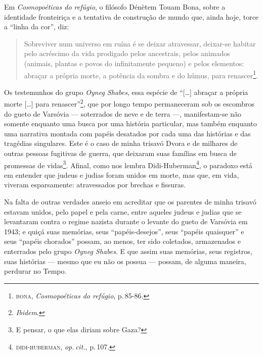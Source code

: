 Em \emph{Cosmopoéticas do refúgio}, o filósofo Dénètem Touam Bona, sobre
a identidade fronteiriça e a tentativa de construção de mundo que, ainda
hoje, torce a ``linha da cor'', diz:

\begin{quote}
Sobreviver num universo em ruína é se deixar atravessar, deixar-se
habitar pelo acréscimo da vida prodigado pelos ancestrais, pelos
animados (animais, plantas e povos do infinitamente pequeno) e pelos
elementos: abraçar a própria morte, a potência da sombra e do húmus,
para renascer\footnote{\textsc{bona}, \emph{Cosmopoéticas do refúgio}, p.\,85-86.}.
\end{quote}

Os testemunhos do grupo \emph{Oyneg Shabes}, essa espécie de
``{[}\ldots{}{]} abraçar a própria morte {[}\ldots{}{]} para
renascer''\footnote{\emph{Ibidem}.}, que por longo tempo permaneceram sob os
escombros do gueto de Varsóvia --- soterrados de neve e de terra ---,
manifestam-se não somente enquanto uma busca por uma história
particular, mas também enquanto uma narrativa montada com papéis
desatados por cada uma das histórias e das tragédias singulares. Este é
o caso de minha trisavó Dvora e de milhares de outras pessoas fugitivas
de guerra, que deixaram suas famílias em busca de promessas de
vidas\footnote{E pensar, o que elas diriam sobre Gaza?}. Afinal, como
nos lembra Didi-Huberman\footnote{\textsc{didi-huberman}, \emph{op.\,cit.}, p.\,107.}, o
paradoxo está em entender que judeus e judias foram unidos em morte, mas
que, em vida, viveram esparsamente: atravessados por brechas e fissuras.

Na falta de outras verdades anseio em acreditar que os parentes de minha
trisavó estavam unidos, pelo papel e pela carne, entre aqueles judeus e
judias que se levantaram contra o regime nazista durante o levante do
gueto de Varsóvia em 1943; e quiçá suas memórias, seus
``papéis-desejos'', seus ``papéis quaisquer'' e seus
``papéis chorados'' possam, ao menos, ter sido coletados,
armazenados e enterrados pelo grupo \emph{Oyneg Shabes}. E que assim
suas memórias, seus registros, suas histórias --- mesmo que eu não os
possua --- possam, de alguma maneira, perdurar no Tempo.


